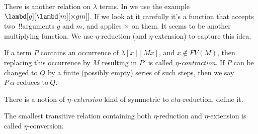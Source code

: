 \documentclass[../../../include/open-logic-section]{subfiles}
\begin{document}

There is another relation on $\lambda$ terms. In
\olref[lc][int][fv] we use the example $\lambd[g][\lambd[m][\times g
m]]$. If we look at it carefully it's a function that accepts two~!!{argument}s
$g$ and $m$, and applies $\times$ on them. It seems to be another
multiplying function. We use $\eta$-reduction (and $\eta$-extension) to
capture this idea.

\begin{defn}
  If a term $P$ contains an occurrence of $\lambda[x][M x]$, and $x
  \notin FV(M)$, then replacing this occurrence by $M$ resulting in
  $P'$ is called \emph{$\eta$-contraction}. If $P$ can be changed to
  $Q$ by a finite (possibly empty) series of such steps, then we say
  $P ~\alpha\text{-reduces to}~Q$.
\end{defn}

\begin{prob}
  There is a notion of \emph{$\eta$-extension} kind of symmetric to
  $eta$-reduction, define it.
\end{prob}

The smallest transitive relation containing both $\eta$-reduction and
$\eta$-extension is called $\eta$-conversion.
\end{document}
